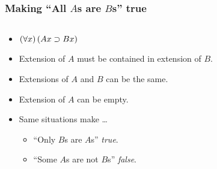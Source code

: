 \begin{frame}
\frametitle{Making ``All $A$s are $B$s'' true}

\begin{columns}
  \begin{column}{.5\textwidth}
    \begin{itemize}
      \item $(\forall x)\,(Ax \supset Bx)$
      \item Extension of $A$ must be \alert<1>{contained in extension of $B$}.
      \item Extensions of $A$ and $B$ \alert<2>{can be the same}.
      \item Extension of $A$ \alert<3>{can be empty}.
      \item Same situations make \dots
      \begin{itemize}
        \item ``Only $B$s are $A$s'' \emph{true}.
        \item ``Some $A$s are not $B$s'' \emph{false}.
      \end{itemize}
    \end{itemize}
  \end{column}
  \begin{column}{.5\textwidth}
\end{column}
\end{columns}
\end{frame}

